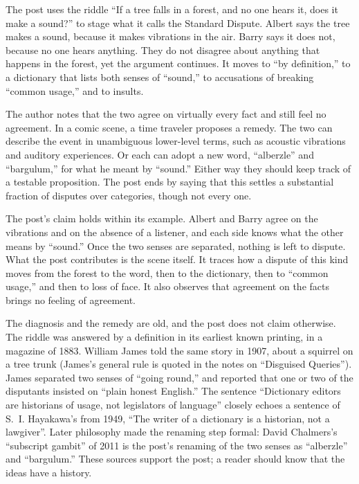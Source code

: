 \begin{afterword}
\summaryhead

The post uses the riddle ``If a tree falls in a forest, and no one hears it, does it make a sound?'' to stage what it calls the Standard Dispute. Albert says the tree makes a sound, because it makes vibrations in the air. Barry says it does not, because no one hears anything. They do not disagree about anything that happens in the forest, yet the argument continues. It moves to ``by definition,'' to a dictionary that lists both senses of ``sound,'' to accusations of breaking ``common usage,'' and to insults.

The author notes that the two agree on virtually every fact and still feel no agreement. In a comic scene, a time traveler proposes a remedy. The two can describe the event in unambiguous lower-level terms, such as acoustic vibrations and auditory experiences. Or each can adopt a new word, ``alberzle'' and ``bargulum,'' for what he meant by ``sound.'' Either way they should keep track of a testable proposition. The post ends by saying that this settles a substantial fraction of disputes over categories, though not every one.

\responsehead

The post's claim holds within its example. Albert and Barry agree on the vibrations and on the absence of a listener, and each side knows what the other means by ``sound.'' Once the two senses are separated, nothing is left to dispute. What the post contributes is the scene itself. It traces how a dispute of this kind moves from the forest to the word, then to the dictionary, then to ``common usage,'' and then to loss of face. It also observes that agreement on the facts brings no feeling of agreement.

The diagnosis and the remedy are old, and the post does not claim otherwise. The riddle was answered by a definition in its earliest known printing, in a magazine of 1883. William James told the same story in 1907, about a squirrel on a tree trunk (James's general rule is quoted in the notes on ``Disguised Queries''). James separated two senses of ``going round,'' and reported that one or two of the disputants insisted on ``plain honest English.'' The sentence ``Dictionary editors are historians of usage, not legislators of language'' closely echoes a sentence of S.~I. Hayakawa's from 1949, ``The writer of a dictionary is a historian, not a lawgiver''. Later philosophy made the renaming step formal: David Chalmers's ``subscript gambit'' of 2011 is the post's renaming of the two senses as ``alberzle'' and ``bargulum.'' These sources support the post; a reader should know that the ideas have a history.


\end{afterword}
